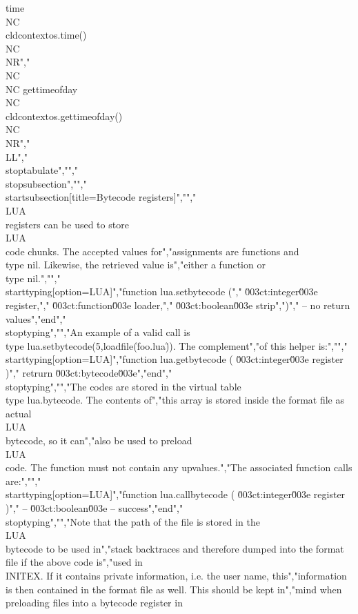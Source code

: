 time              \\NC \\cldcontext{os.time()}               \\NC \\NR","    \\NC         \\NC gettimeofday      \\NC \\cldcontext{os.gettimeofday()}       \\NC \\NR","    \\LL","\\stoptabulate","","\\stopsubsection","","\\startsubsection[title=Bytecode registers]","","\\LUA\\ registers can be used to store \\LUA\\ code chunks. The accepted values for","assignments are functions and \\type {nil}. Likewise, the retrieved value is","either a function or \\type {nil}.","","\\starttyping[option=LUA]","function lua.setbytecode (","    \u003ct:integer\u003e  register,","    \u003ct:function\u003e loader,","    \u003ct:boolean\u003e  strip",")","    -- no return values","end","\\stoptyping","","An example of a valid call is \\type {lua.setbytecode(5,loadfile(\"foo.lua\"))}. The complement","of this helper is:","","\\starttyping[option=LUA]","function lua.getbytecode ( \u003ct:integer\u003e register )","    retrurn \u003ct:bytecode\u003e","end","\\stoptyping","","The codes are stored in the virtual table \\type {lua.bytecode}. The contents of","this array is stored inside the format file as actual \\LUA\\ bytecode, so it can","also be used to preload \\LUA\\ code. The function must not contain any upvalues.","The associated function calls are:","","\\starttyping[option=LUA]","function lua.callbytecode ( \u003ct:integer\u003e register )","    -- \u003ct:boolean\u003e -- success","end","\\stoptyping","","Note that the path of the file is stored in the \\LUA\\ bytecode to be used in","stack backtraces and therefore dumped into the format file if the above code is","used in \\INITEX. If it contains private information, i.e. the user name, this","information is then contained in the format file as well. This should be kept in","mind when preloading files into a bytecode register in 